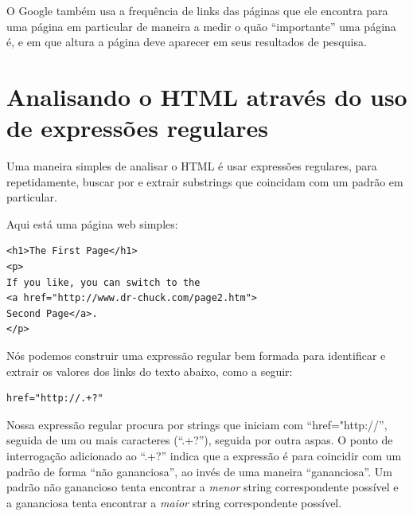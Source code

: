 O Google também usa a frequência de links das páginas que ele encontra
para uma página em particular de maneira a medir o quão ``importante'' 
uma página é, e em que altura a página deve aparecer em seus resultados de
pesquisa.

\section{Analisando o HTML através do uso de expressões regulares}

Uma maneira simples de analisar o HTML é usar expressões regulares, para
repetidamente, buscar por e extrair substrings que coincidam com um
padrão em particular.

Aqui está uma página web simples:

\beforeverb
\begin{verbatim}
<h1>The First Page</h1>
<p>
If you like, you can switch to the
<a href="http://www.dr-chuck.com/page2.htm">
Second Page</a>.
</p>
\end{verbatim}
\afterverb

Nós podemos construir uma expressão regular bem formada para
identificar e extrair os valores dos links do texto abaixo,
como a seguir:

\beforeverb
\begin{verbatim}
href="http://.+?"
\end{verbatim}
\afterverb

Nossa expressão regular procura por strings que iniciam com
``href="http://'', seguida de um ou mais caracteres
(``.+?''), seguida por outra aspas.  O ponto de interrogação 
adicionado ao ``.+?'' indica que a expressão é para coincidir
com um padrão de forma ``não gananciosa'', ao invés de uma
maneira ``gananciosa''. Um padrão não ganancioso tenta encontrar
a {\em menor} string correspondente possível e a gananciosa tenta
encontrar a {\em maior} string correspondente possível.

